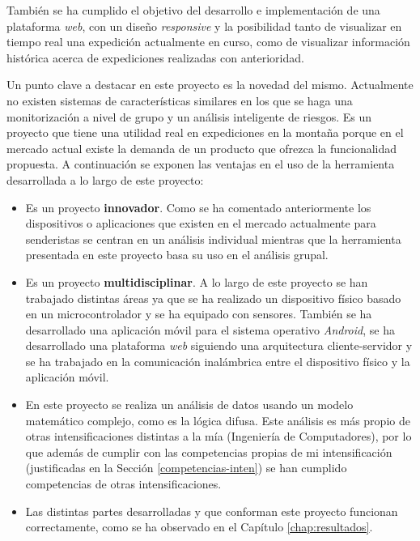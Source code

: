 También se ha cumplido el objetivo del desarrollo e implementación de una plataforma \textit{web}, con un diseño \textit{responsive} y la posibilidad tanto de visualizar en tiempo real una expedición actualmente en curso, como de visualizar información histórica acerca de expediciones realizadas con anterioridad.

Un punto clave a destacar en este proyecto es la novedad del mismo. Actualmente no existen sistemas de características similares en los que se haga una monitorización a nivel de grupo y un análisis inteligente de riesgos. Es un proyecto que tiene una utilidad real en expediciones en la montaña porque en el mercado actual existe la demanda de un producto que ofrezca la funcionalidad propuesta. A continuación se exponen las ventajas en el uso de la herramienta desarrollada a lo largo de este proyecto:

\begin{itemize}
\item Es un proyecto \textbf{innovador}. Como se ha comentado anteriormente los dispositivos o aplicaciones que existen en el mercado actualmente para senderistas se centran en un análisis individual mientras que la herramienta presentada en este proyecto basa su uso en el análisis grupal.
\item Es un proyecto \textbf{multidisciplinar}. A lo largo de este proyecto se han trabajado distintas áreas ya que se ha realizado un dispositivo físico basado en un microcontrolador y se ha equipado con sensores. También se ha desarrollado una aplicación móvil para el sistema operativo \textit{Android}, se ha desarrollado una plataforma \textit{web} siguiendo una arquitectura cliente-servidor y se ha trabajado en la comunicación inalámbrica entre el dispositivo físico y la aplicación móvil.
\item En este proyecto se realiza un análisis de datos usando un modelo matemático complejo, como es la lógica difusa. Este análisis es más propio de otras intensificaciones distintas a la mía (Ingeniería de Computadores), por lo que además de cumplir con las competencias propias de mi intensificación (justificadas en la Sección \ref{competencias-inten}) se han cumplido competencias de otras intensificaciones.
\item Las distintas partes desarrolladas y que conforman este proyecto funcionan correctamente, como se ha observado en el Capítulo \ref{chap:resultados}.
\end{itemize}

